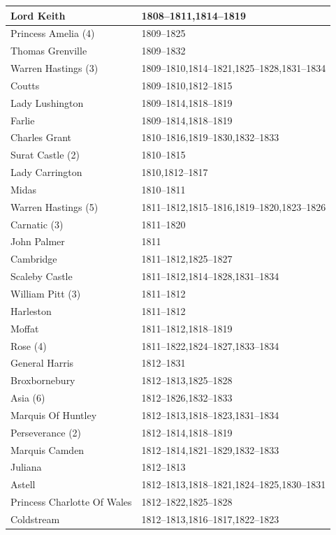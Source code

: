 \documentclass[CP]{copernicus}
\begin{document}
\begin{table}[!hbp]
\begin{minipage}[b]{0.5\linewidth}
{\begin{tabular}{|p{3.5cm}|p{3.5cm}|}
\hline
Lord Keith & 1808--1811,1814--1819\\
\hline
Princess Amelia (4) & 1809--1825\\
\hline
Thomas Grenville & 1809--1832\\
\hline
Warren Hastings (3) & 1809--1810,1814--1821,1825--1828,1831--1834\\
\hline
Coutts & 1809--1810,1812--1815\\
\hline
Lady Lushington & 1809--1814,1818--1819\\
\hline
Farlie & 1809--1814,1818--1819\\
\hline
Charles Grant & 1810--1816,1819--1830,1832--1833\\
\hline
Surat Castle (2) & 1810--1815\\
\hline
Lady Carrington & 1810,1812--1817\\
\hline
Midas & 1810--1811\\
\hline
Warren Hastings (5) & 1811--1812,1815--1816,1819--1820,1823--1826\\
\hline
Carnatic (3) & 1811--1820\\
\hline
John Palmer & 1811\\
\hline
Cambridge & 1811--1812,1825--1827\\
\hline
Scaleby Castle & 1811--1812,1814--1828,1831--1834\\
\hline
William Pitt (3) & 1811--1812\\
\hline
Harleston & 1811--1812\\
\hline
Moffat & 1811--1812,1818--1819\\
\hline
Rose (4) & 1811--1822,1824--1827,1833--1834\\
\hline
General Harris & 1812--1831\\
\hline
Broxbornebury & 1812--1813,1825--1828\\
\hline
Asia (6) & 1812--1826,1832--1833\\
\hline
Marquis Of Huntley & 1812--1813,1818--1823,1831--1834\\
\hline
Perseverance (2) & 1812--1814,1818--1819\\
\hline
Marquis Camden & 1812--1814,1821--1829,1832--1833\\
\hline
Juliana & 1812--1813\\
\hline
Astell & 1812--1813,1818--1821,1824--1825,1830--1831\\
\hline
Princess Charlotte Of Wales & 1812--1822,1825--1828\\
\hline
Coldstream & 1812--1813,1816--1817,1822--1823\\

\end{tabular}}
\end{minipage}
\end{table}
\end{document}
